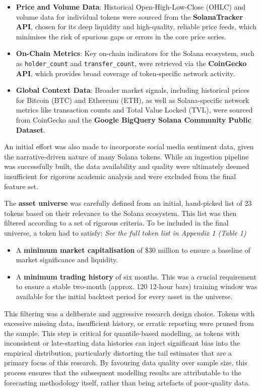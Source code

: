 \documentclass[
  a4paper,
  DIV=11,
  numbers=noendperiod]{scrreprt}
\providecommand{\tightlist}{%
  \setlength{\itemsep}{0pt}\setlength{\parskip}{0pt}}
\begin{document}
\begin{itemize}
\tightlist
\item
  \textbf{Price and Volume Data}: Historical Open-High-Low-Close (OHLC)
  and volume data for individual tokens were sourced from the
  \textbf{SolanaTracker API}, chosen for its deep liquidity and
  high-quality, reliable price feeds, which minimises the risk of
  spurious gaps or errors in the core price series.
\item
  \textbf{On-Chain Metrics}: Key on-chain indicators for the Solana
  ecosystem, such as \texttt{holder\_count} and
  \texttt{transfer\_count}, were retrieved via the \textbf{CoinGecko
  API}, which provides broad coverage of token-specific network
  activity.
\item
  \textbf{Global Context Data}: Broader market signals, including
  historical prices for Bitcoin (BTC) and Ethereum (ETH), as well as
  Solana-specific network metrics like transaction counts and Total
  Value Locked (TVL), were sourced from CoinGecko and the \textbf{Google
  BigQuery Solana Community Public Dataset}.
\end{itemize}

An initial effort was also made to incorporate social media sentiment
data, given the narrative-driven nature of many Solana tokens. While an
ingestion pipeline was successfully built, the data availability and
quality were ultimately deemed insufficient for rigorous academic
analysis and were excluded from the final feature set.

The \textbf{asset universe} was carefully defined from an initial,
hand-picked list of 23 tokens based on their relevance to the Solana
ecosystem. This list was then filtered according to a set of rigorous
criteria. To be included in the final universe, a token had to satisfy:
\emph{See the full token list in Appendix 1 (Table 1)}

\begin{itemize}
\tightlist
\item
  A \textbf{minimum market capitalisation} of \$30 million to ensure a
  baseline of market significance and liquidity.
\item
  A \textbf{minimum trading history} of six months. This was a crucial
  requirement to ensure a stable two-month (approx. 120 12-hour bars)
  training window was available for the initial backtest period for
  every asset in the universe.
\end{itemize}

This filtering was a deliberate and aggressive research design choice.
Tokens with excessive missing data, insufficient history, or erratic
reporting were pruned from the sample. This step is critical for
quantile-based modelling, as tokens with inconsistent or late-starting
data histories can inject significant bias into the empirical
distribution, particularly distorting the tail estimates that are a
primary focus of this research. By favouring data quality over sample
size, this process ensures that the subsequent modelling results are
attributable to the forecasting methodology itself, rather than being
artefacts of poor-quality data.
\end{document}
